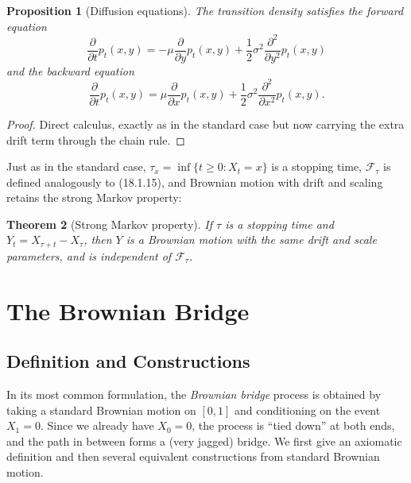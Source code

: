 \documentclass[12pt,openany]{book}
\newtheorem{theorem}{Theorem}[section]
\newtheorem{proposition}[theorem]{Proposition}
\theoremstyle{definition}
\theoremstyle{remark}
\newcommand{\Fscr}{\mathcal{F}}
\begin{document}
\begin{proposition}[Diffusion equations]
The transition density satisfies the forward equation
\begin{equation}
    \frac{\partial}{\partial t}p_t(x,y) = -\mu\frac{\partial}{\partial y}p_t(x,y) + \frac12\sigma^2\frac{\partial^2}{\partial y^2}p_t(x,y) \tag{18.2.9}
\end{equation}
and the backward equation
\begin{equation}
    \frac{\partial}{\partial t}p_t(x,y) = \mu\frac{\partial}{\partial x}p_t(x,y) + \frac12\sigma^2\frac{\partial^2}{\partial x^2}p_t(x,y). \tag{18.2.10}
\end{equation}
\end{proposition}
\begin{proof}
Direct calculus, exactly as in the standard case but now carrying the extra drift term through the chain rule.
\end{proof}
 
Just as in the standard case, $\tau_x = \inf\{t\ge0 : X_t=x\}$ is a stopping time, $\Fscr_\tau$ is defined analogously to (18.1.15), and Brownian motion with drift and scaling retains the strong Markov property:
 
\begin{theorem}[Strong Markov property]
If $\tau$ is a stopping time and $Y_t = X_{\tau+t}-X_\tau$, then $Y$ is a Brownian motion with the same drift and scale parameters, and is independent of $\Fscr_\tau$.
\end{theorem}
 
\newpage
\section{The Brownian Bridge}
\label{sec:bridge}
 
\subsection{Definition and Constructions}
 
In its most common formulation, the \emph{Brownian bridge} process is obtained by taking a standard Brownian motion on $[0,1]$ and conditioning on the event $X_1=0$. Since we already have $X_0=0$, the process is ``tied down'' at both ends, and the path in between forms a (very jagged) bridge. We first give an axiomatic definition and then several equivalent constructions from standard Brownian motion.
 
\end{document}

